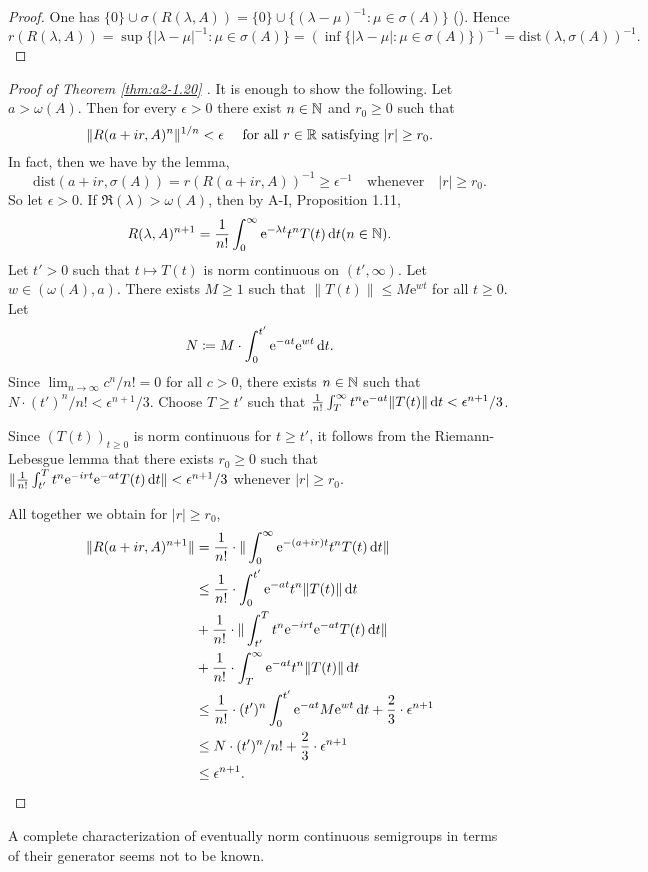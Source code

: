 \begin{proof}
One has $\{0\} \cup \sigma(R(\lambda,A)) = \{0\} \cup \{(\lambda-\mu)^{-1} \colon \mu \in \sigma(A)\}$ (\citet[Lemma~ 2.11]{davies:1980}).
Hence 
\[
r(R(\lambda,A)) = \sup \{|\lambda-\mu|^{-1} \colon \mu \in \sigma(A)\} = 
(\inf \{|\lambda-\mu| \colon \mu \in \sigma(A)\})^{-1} = \text{dist}(\lambda,\sigma(A))^{-1}.
\]
\end{proof}
\begin{proof}[Proof of Theorem  \ref{thm:a2-1.20}  ]
It is enough to show the following.
Let $a > \omega(A)$.
Then for every $\epsilon > 0$ there exist $n \in \mathbb{N}$ and $r_0 \geq 0$ such that
\[
\|R(a+ir,A)^n\|^{1/n} < \epsilon \quad  \text{ for all } r \in \mathbb{R} \text{ satisfying } |r| \geq r_{0}.
\]
In fact, then we have by the lemma, 
\[
\text{dist}(a+ir,\sigma(A)) = r(R(a+ir,A))^{-1} \geq \epsilon^{-1} \quad \text{whenever} \quad |r| \geq r_{0}.
\]
So let $\epsilon > 0$.
If $\Re(\lambda) > \omega(A)$, then by A-I, Proposition 1.11,
\[
R(\lambda,A)^{n+1} = \frac{1}{n!}\int_0^\infty \mathrm{e}^{-\lambda t}t^nT(t) \mathop{}\!\mathrm{d}{t} (n \in \mathbb{N}).
\]
Let $t' > 0$ such that $t \mapsto T(t)$ is norm continuous on $(t',\infty)$.
Let $w \in (\omega(A),a)$.
There exists $M \geq 1$ such that $\|T(t)\| \leq M\mathrm{e}^{wt}$ for all $t \geq 0$.
Let 
\[
N \coloneqq M\cdot\int_{0}^{t'} \mathrm{e}^{-at}\mathrm{e}^{wt} \mathop{}\!\mathrm{d}{t}.
\]
Since $\lim_{n\to\infty} c^n/n! = 0$ for all $c > 0$, there exists $n \in \mathbb{N}$ such that \\ 
$N\cdot(t')^n/n! < \epsilon^{n+1}/3$.
Choose $T \geq t'$ such that $\frac{1}{n!}\int_T^\infty t^n\mathrm{e}^{-at}\|T(t)\| \mathop{}\!\mathrm{d}{t} < \epsilon^{n+1}/3$.

Since $(T(t))_{t\geq 0}$ is norm continuous for $t \geq t'$, it follows from the Riemann-Lebesgue lemma that there exists $r_{0} \geq 0$ such that 
$\|\frac{1}{n!}\int_{t'}^T t^{n}\mathrm{e}^{-irt}\mathrm{e}^{-at}T(t) \mathop{}\!\mathrm{d}{t}\| < \epsilon^{n+1}/3$ whenever $|r| \geq r_{0}$.

All together we obtain for $|r| \geq r_{0}$,
\begin{align*}
    \|R(a+ir,A)^{n+1}\| & = \frac{1}{n!}\cdot\|\int_0^\infty \mathrm{e}^{-(a+ir)t}t^nT(t) \mathop{}\!\mathrm{d}{t}\| \\
    & \leq \frac{1}{n!}\cdot\int_{0}^{t'} \mathrm{e}^{-at}t^n\|T(t)\| \mathop{}\!\mathrm{d}{t} \\
    & + \frac{1}{n!}\cdot\|\int_{t'}^T t^n\mathrm{e}^{-irt}\mathrm{e}^{-at}T(t) \mathop{}\!\mathrm{d}{t}\| \\
    & + \frac{1}{n!}\cdot\int_T^\infty \mathrm{e}^{-at}t^n\|T(t)\| \mathop{}\!\mathrm{d}{t} \\
    & \leq \frac{1}{n!}\cdot(t')^{n}\int_{0}^{t'} \mathrm{e}^{-at}M\mathrm{e}^{wt} \mathop{}\!\mathrm{d}{t} + \frac{2}{3}\cdot\epsilon^{n+1} \\
    & \leq N\cdot(t')^n/n! + \frac{2}{3}\cdot\epsilon^{n+1} \\
    & \leq \epsilon^{n+1}.
\end{align*}
\end{proof}
A complete characterization of eventually norm continuous semigroups in terms of their generator seems not to be known.

